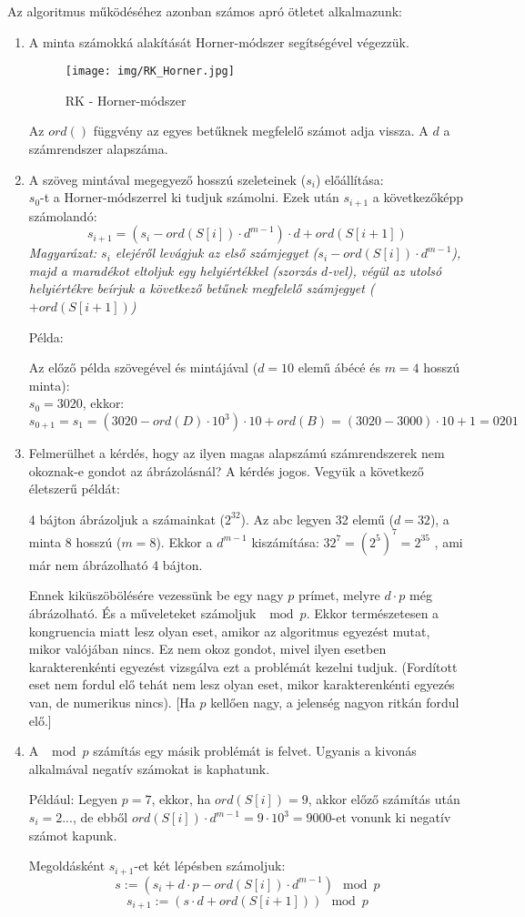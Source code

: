 \documentclass[margin=0px]{article}
\begin{document}
			\noindent
			Az algoritmus működéséhez azonban számos apró ötletet alkalmazunk:
			\begin{enumerate}
				\item A minta számokká alakítását Horner-módszer segítségével végezzük.
					\begin{figure}[H]
						\centering
						\texttt{[image: img/RK\_Horner.jpg]}
						\caption{RK - Horner-módszer}
						\label{fig:RK_Horner}
					\end{figure}
					Az $ord()$ függvény az egyes betűknek megfelelő számot adja vissza. A $d$ a számrendszer alapszáma.
				\item A szöveg mintával megegyező hosszú szeleteinek ($s_i$) előállítása: \\
					$s_0$-t a Horner-módszerrel ki tudjuk számolni. Ezek után $s_{i+1}$ a következőképp számolandó:
					\[s_{i+1} = (s_i - ord(S[i])\cdot d^{m-1})\cdot d  + ord(S[i+1])\]
					\textit{Magyarázat: $s_i$ elejéről levágjuk az első számjegyet ($s_i - ord(S[i])\cdot d^{m-1}$), majd a maradékot eltoljuk egy helyiértékkel (szorzás $d$-vel), végül az utolsó helyiértékre beírjuk a következő betűnek megfelelő számjegyet ($+ord(S[i+1])$)}
					
					Példa:
					
						Az előző példa szövegével és mintájával ($d=10$ elemű ábécé és $m=4$ hosszú minta): \\
							$s_0 = 3020$, ekkor: $s_{0+1} = s_1 = (3020 - ord(D) \cdot 10^3)\cdot 10 + ord(B) = (3020-3000)\cdot 10 +1 = 0201$
				\item Felmerülhet a kérdés, hogy az ilyen magas alapszámú számrendszerek nem okoznak-e gondot az ábrázolásnál? A kérdés jogos. Vegyük a következő életszerű példát:
				
				4 bájton ábrázoljuk a számainkat ($2^{32}$). Az abc legyen 32 elemű ($d=32$), a minta 8 hosszú ($m=8$). Ekkor a $d^{m-1}$ kiszámítása: $32^7 = (2^5)^7 = 2^{35}$ , ami már nem ábrázolható 4 bájton.
				
				Ennek kiküszöbölésére vezessünk be egy nagy $p$ prímet, melyre $d\cdot p$ még ábrázolható. És a műveleteket számoljuk $\mod{p}$. Ekkor természetesen a kongruencia miatt lesz olyan eset, amikor az algoritmus egyezést mutat, mikor valójában nincs. Ez nem okoz gondot, mivel ilyen esetben karakterenkénti egyezést vizsgálva ezt a problémát kezelni tudjuk. (Fordított eset nem fordul elő tehát nem lesz olyan eset, mikor karakterenkénti egyezés van, de numerikus nincs). [Ha $p$ kellően nagy, a jelenség nagyon ritkán fordul elő.]
				
				\item A $\mod{p}$ számítás egy másik problémát is felvet. Ugyanis a kivonás alkalmával negatív számokat is kaphatunk.
				
				Például: Legyen $p=7$, ekkor, ha $ord(S[i]) = 9$, akkor előző számítás után $s_i = 2...$, de ebből $ord(S[i])\cdot d^{m-1} = 9\cdot 10^3 = 9000$-et vonunk ki negatív számot kapunk. 
				
				Megoldásként $s_{i+1}$-et két lépésben számoljuk:
				\[s := (s_i+d\cdot p - ord(S[i])\cdot d^{m-1}) \mod{p} \]
				\[s_{i+1} := (s\cdot d + ord(S[i+1])) \mod{p} \]
			\end{enumerate}			
\end{document}
